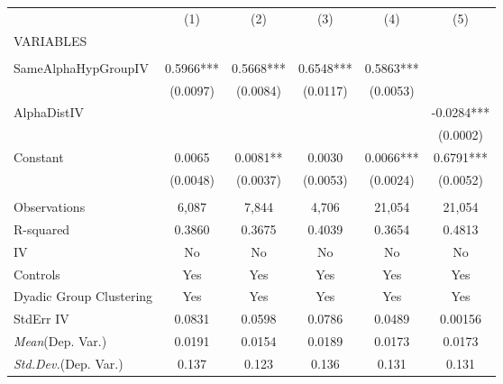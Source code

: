 \documentclass[]{article}
\begin{document}
\begin{tabular}{lccccc} \hline
 & (1) & (2) & (3) & (4) & (5) \\
VARIABLES &  &  &  &  &  \\ \hline
 &  &  &  &  &  \\
SameAlphaHypGroupIV & 0.5966*** & 0.5668*** & 0.6548*** & 0.5863*** &  \\
 & (0.0097) & (0.0084) & (0.0117) & (0.0053) &  \\
AlphaDistIV &  &  &  &  & -0.0284*** \\
 &  &  &  &  & (0.0002) \\
Constant & 0.0065 & 0.0081** & 0.0030 & 0.0066*** & 0.6791*** \\
 & (0.0048) & (0.0037) & (0.0053) & (0.0024) & (0.0052) \\
 &  &  &  &  &  \\
Observations & 6,087 & 7,844 & 4,706 & 21,054 & 21,054 \\
R-squared & 0.3860 & 0.3675 & 0.4039 & 0.3654 & 0.4813 \\
IV & No & No & No & No & No \\
Controls & Yes & Yes & Yes & Yes & Yes \\
Dyadic Group Clustering & Yes & Yes & Yes & Yes & Yes \\
StdErr IV & 0.0831 & 0.0598 & 0.0786 & 0.0489 & 0.00156 \\
\textit{Mean}(Dep. Var.) & 0.0191 & 0.0154 & 0.0189 & 0.0173 & 0.0173 \\
 \textit{Std.Dev.}(Dep. Var.) & 0.137 & 0.123 & 0.136 & 0.131 & 0.131 \\ \hline
\end{tabular}
\end{document}
